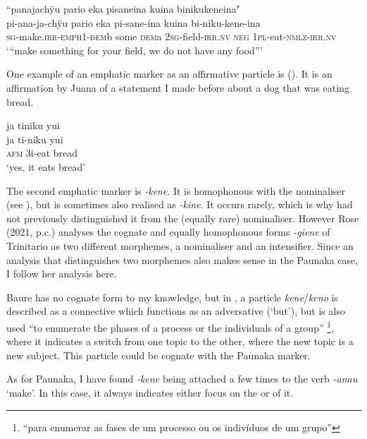 \ea\label{ex:emphi-3}
\begingl
\glpreamble “panajachÿu pario eka pisaneina kuina binikukeneina"\\
\gla pi-ana-ja-chÿu pario eka pi-sane-ina kuina bi-niku-kene-ina\\
\textsc{sg}-make.\textsc{irr}-\textsc{emph}1-\textsc{dem}b some \textsc{dem}a 2\textsc{sg}-field-\textsc{irr.nv} \textsc{neg} 1\textsc{pl}-eat-\textsc{nmlz}-\textsc{irr.nv}\\
\glft ‘“make something for your field, we do not have any food”’
\endgl
\trailingcitation{[mox-n110920l.015]}
\xe

One example of an emphatic marker as an affirmative particle is (). It is an affirmation by Juana of a statement I made before about a dog that was eating bread.

\ea\label{ex:emphi-4}
\begingl
\glpreamble ja tiniku yui\\
\gla ja ti-niku yui\\
\glb \textsc{afm} 3i-eat bread\\
\glft ‘yes, it eats bread’
\endgl
\trailingcitation{[jxx-e110923l-2.042]}
\xe



The second emphatic marker is \textit{-kene}. It is homophonous with the nominaliser (see ), but is sometimes also realised as \textit{-kine}. It occurs rarely, which is why had not previously distinguished it from the (equally rare) nominaliser. However Rose (2021, p.c.) analyses the cognate and equally homophonous forms \textit{-giene} of Trinitario as two different morphemes, a nominaliser and an intensifier. Since an analysis that distinguishes two morphemes also makes sense in the Paunaka case, I follow her analysis here. 

\hspace*{-1.9pt}Baure has no cognate form to my knowledge, but in , a particle \textit{kene}/\textit{keno} is described as a connective which functions as an adversative (‘but’), but is also used “to enumerate the phases of a process or the individuals of a group” \citep[77]{ButlerEkdahl2014}\footnote{“para enumerar as fases de um processo ou os indivíduos de um grupo”}, where it indicates a switch from one topic to the other, where the new topic is a new subject. This particle could be cognate with the Paunaka marker.

As for Paunaka, I have found \textit{-kene} being attached a few times to the verb \textit{-anau} ‘make’. In this case, it always indicates either focus on the  or  of it.

